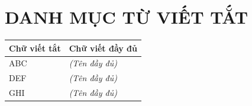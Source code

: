 \chapter*{DANH MỤC TỪ VIẾT TẮT}

\begin{table}[h]
    \centering
    \begin{tabularx}{\textwidth}{l X}
    \toprule
    \textbf{Chữ viết tắt} & \textbf{Chữ viết đầy đủ} \\
    \midrule
    ABC  & \textit{(Tên đầy đủ)} \\
    DEF  & \textit{(Tên đầy đủ)} \\
    GHI  & \textit{(Tên đầy đủ)} \\
    \bottomrule
    \end{tabularx}
\end{table}
